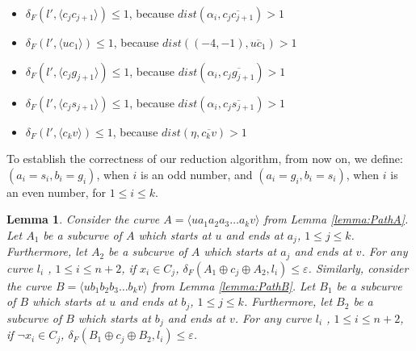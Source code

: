 \documentclass[12pt]{dalthesis}
\def\favoritefont{\bfseries \sffamily}
\def\QED{\ensuremath{{\Box}}}
\def\markatright#1{\leavevmode\unskip\nobreak\quad\hspace*{\fill}{#1}}
\newenvironment{proof}
	{\begin{trivlist}\item[\hskip\labelsep{\favoritefont Proof:}]}
	{\markatright{\QED}\end{trivlist}}
\newtheorem{lemma}[theorem]{Lemma}
\newcommand{\eps}{\varepsilon}
\newcommand{\distF}{\delta_F}
\newcommand{\ap}{\oplus}
\newcommand{\gre}{{g}}
\newcommand{\sma}{{s}}
\newcommand{\Seg}[1]{{\overline{#1}}}
\newcommand{\cfev}{{l}}
\begin{document}
\begin{proof}
\begin{itemize}
\item $\distF(l',\langle c_jc_{j+1} \rangle ) \le 1$,  because $dist( \alpha_{i},\Seg{c_jc_{j+1}}) > 1$



\item $\distF(l',\langle uc_1 \rangle) \le 1$, because $dist( (-4,-1),\Seg{uc_1}) >1$ 



\item  $\distF(l',\langle c_j\gre_{j+1} \rangle) \le 1$, because $dist( \alpha_i,\Seg{c_j\gre_{j+1}}) >1$ 



\item  $\distF(l',\langle c_j\sma_{j+1} \rangle ) \le 1$, because $dist( \alpha_i,\Seg{c_j\sma_{j+1}}) >1$ 



\item  $\distF(l',\langle c_kv \rangle) \le 1$, because $dist( \eta,\Seg{c_kv}) >1$ 
\end{itemize}


\end{proof}







\noindent To establish the correctness of
our reduction algorithm, 
from now on, we define:
$(a_i = \sma_i, b_i = \gre_i)$,  
 when $i$ is an odd number, 
and
$(a_i = \gre_i, b_i = \sma_i)$, 
when $i$ is an even number, for $1 \le i \le k$.


\begin{lemma}\label{lemma:ABCanSeeC}
Consider the curve $A = \langle ua_1a_2a_3 \dots a_k v \rangle$ from Lemma \ref{lemma:PathA}. Let 
$A_1$ be a subcurve of $A$ which starts at $u$ and ends at $a_j$, $1 \le j \le k$.
Furthermore, let $A_2$ be a subcurve of $A$ which starts at $a_j$ and ends at $v$.
For any curve $\cfev_i$ , $1\le i \le n+2$,
if $x_i \in C_j$, 
$\distF(A_1 \ap c_j \ap A_2, \cfev_i) \le \eps$. 
Similarly, consider the curve $B = \langle ub_1b_2b_3 \dots b_k v \rangle$ from Lemma \ref{lemma:PathB}. Let 
$B_1$ be a subcurve of $B$ which starts at $u$ and ends at $b_j$, $1 \le j \le k$.
Furthermore, let $B_2$ be a subcurve of $B$ which starts at $b_j$ and ends at $v$.
For any curve $\cfev_i$ , $1\le i \le n+2$,
if $\neg x_i \in C_j$,   
$\distF(B_1 \ap c_j \ap B_2, \cfev_i) \le \eps$. 
\end{lemma}
\end{document}
